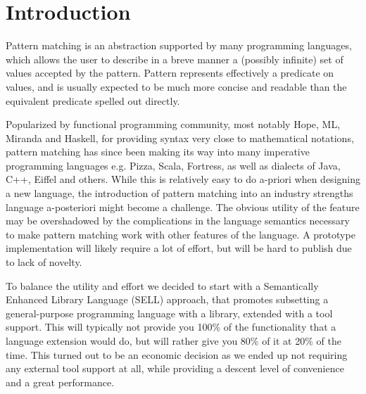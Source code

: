 \documentclass[preprint]{sigplanconf}
\begin{document}
\section{Introduction} %
\label{sec:intro}


%


Pattern matching is an abstraction supported by many programming languages, which 
allows the user to describe in a breve manner a (possibly infinite) set of 
values accepted by the pattern. Pattern represents effectively a predicate on 
values, and is usually expected to be much more concise and readable than the 
equivalent predicate spelled out directly.

Popularized by functional programming community, most notably Hope\cite{BMS80}, 
ML\cite{ML90}, Miranda\cite{Miranda85} and Haskell\cite{Haskell98Book}, for 
providing syntax very close to mathematical notations, pattern matching has 
since been making its way into many imperative programming languages e.g. 
Pizza\cite{Odersky97pizzainto}, Scala\cite{Scala2nd}, Fortress\cite{RPS10}, as 
well as dialects of Java\cite{Liu03jmatch:iterable,HydroJ2003}, C++\cite{Prop96}, 
Eiffel\cite{Moreau:2003} and others. While this is relatively
easy to do a-priori when designing a new language, the introduction of pattern 
matching into an industry strengths language a-posteriori might become a 
challenge. The obvious utility of the feature may be overshadowed by the 
complications in the language semantics necessary to make pattern matching work 
with other features of the language. A prototype implementation will likely 
require a lot of effort, but will be hard to publish due to lack of novelty.

To balance the utility and effort we decided to start with a Semantically 
Enhanced Library Language (SELL) approach\cite{SELL}, that promotes subsetting a
general-purpose programming language with a library, extended with a tool 
support. This will typically not provide you 100\% of the functionality that a 
language extension would do, but will rather give you 80\% of it at 20\% of the 
time. This turned out to be an economic decision as we ended up not requiring 
any external tool support at all, while providing a descent level of convenience 
and a great performance.
\end{document}
